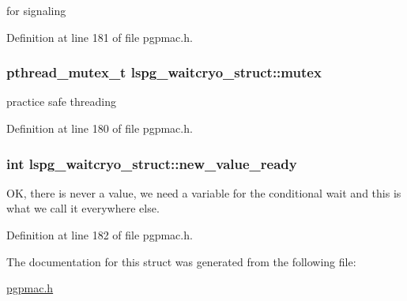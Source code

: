 for signaling 



Definition at line 181 of file pgpmac.\-h.

\hypertarget{structlspg__waitcryo__struct_a62b50ead380fc8a6be35956eba384ba6}{
\subsubsection[{mutex}]{\setlength{\rightskip}{0pt plus 5cm}pthread\-\_\-mutex\-\_\-t lspg\-\_\-waitcryo\-\_\-struct\-::mutex}}\label{structlspg__waitcryo__struct_a62b50ead380fc8a6be35956eba384ba6}


practice safe threading 



Definition at line 180 of file pgpmac.\-h.

\hypertarget{structlspg__waitcryo__struct_a97298b773fd8c1f2ef20159093a08246}{
\subsubsection[{new\-\_\-value\-\_\-ready}]{\setlength{\rightskip}{0pt plus 5cm}int lspg\-\_\-waitcryo\-\_\-struct\-::new\-\_\-value\-\_\-ready}}\label{structlspg__waitcryo__struct_a97298b773fd8c1f2ef20159093a08246}


O\-K, there is never a value, we need a variable for the conditional wait and this is what we call it everywhere else. 



Definition at line 182 of file pgpmac.\-h.



The documentation for this struct was generated from the following file\-:\begin{DoxyCompactItemize}
\item 
\hyperlink{pgpmac_8h}{pgpmac.\-h}\end{DoxyCompactItemize}
